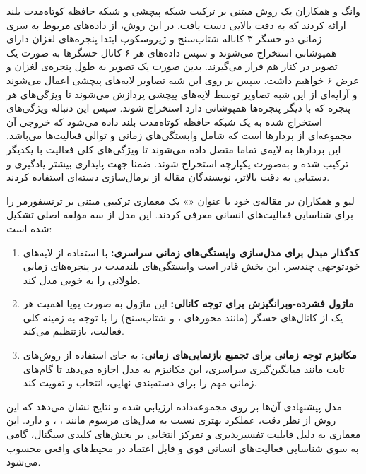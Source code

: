 وانگ و همکاران\cite{wang2020wearable} یک روش مبتنی بر ترکیب شبکه پیچشی و شبکه حافظه کوتاه‌مدت بلند ارائه کردند که به دقت بالایی دست یافت. در این روش، از داده‌های مربوط به سری زمانی دو حسگر ۳ کاناله شتاب‌سنج و ژیروسکوپ ابتدا
پنجره‌های لغزان
دارای همپوشانی استخراج می‌شوند و سپس داده‌های هر ۶ کانال حسگرها به صورت یک تصویر در کنار هم قرار می‌گیرند. بدین صورت یک تصویر به طول پنجره‌ی لغزان و عرض ۶ خواهیم داشت. سپس بر روی این شبه تصاویر لایه‌های پیچشی اعمال می‌شوند و آرایه‌ای از این شبه تصاویر توسط لایه‌های پیچشی پردازش می‌شوند تا ویژگی‌های هر پنجره که با دیگر پنجره‌ها همپوشانی دارد استخراج شوند. سپس این دنباله ویژگی‌های استخراج شده به یک شبکه حافظه کوتاه‌مدت بلند داده می‌شود که خروجی آن مجموعه‌ای از بردارها است که شامل وابستگی‌های زمانی و توالی فعالیت‌ها می‌باشد. این بردارها به لایه‌ی تماما متصل داده می‌شوند تا ویژگی‌های کلی فعالیت با یکدیگر
ترکیب
شده و به‌صورت یکپارچه استخراج شوند. ضمنا جهت پایداری بیشتر یادگیری و دستیابی به دقت بالاتر، نویسندگان مقاله از
نرمال‌سازی دسته‌ای
استفاده کردند.

لیو و همکاران\cite{liu2025set} در مقاله‌ی خود با عنوان
«»
یک معماری ترکیبی مبتنی بر ترنسفورمر را برای شناسایی فعالیت‌های انسانی معرفی کردند. این مدل از سه مؤلفه اصلی تشکیل شده است:

\begin{enumerate}
    \item \textbf{کدگذار مبدل برای مدل‌سازی وابستگی‌های زمانی سراسری:}
    با استفاده از لایه‌های خودتوجهی چندسر، این بخش قادر است وابستگی‌های بلندمدت در پنجره‌های زمانی طولانی را به خوبی مدل کند.

    \item \textbf{ماژول فشرده-وبرانگیزش برای توجه کانالی:}
    این ماژول به صورت پویا اهمیت هر یک از کانال‌های حسگر (مانند محورهای ،  و  شتاب‌سنج) را با توجه به زمینه کلی فعالیت، بازتنظیم می‌کند.

    \item \textbf{مکانیزم توجه زمانی برای تجمیع بازنمایی‌های زمانی:}
    به جای استفاده از روش‌های ثابت مانند میانگین‌گیری سراسری، این مکانیزم به مدل اجازه می‌دهد تا گام‌های زمانی مهم را برای دسته‌بندی نهایی، انتخاب و تقویت کند.
\end{enumerate}

مدل پیشنهادی آن‌ها بر روی مجموعه‌داده  ارزیابی شده و نتایج نشان می‌دهد که این روش از نظر دقت، عملکرد بهتری نسبت به مدل‌های مرسوم مانند ، ،  و  دارد. این معماری به دلیل قابلیت تفسیرپذیری و تمرکز انتخابی بر بخش‌های کلیدی سیگنال، گامی به سوی شناسایی فعالیت‌های انسانی قوی و قابل اعتماد در محیط‌های واقعی محسوب می‌شود.

